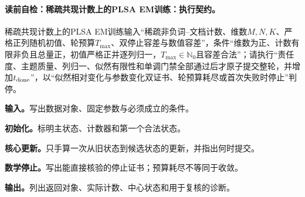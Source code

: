\paragraph{读前自检：稀疏共现计数上的PLSA EM训练：执行契约。}稀疏共现计数上的PLSA EM训练输入“稀疏非负词--文档计数、维数$M,N,K$、严格正列随机初值、轮预算$T_{\max}$、双停止容差与数值容差”，条件“维数为正、计数有限非负且总量正，初值严格正并逐列归一，$T_{\max}\in\mathbb N_0$且容差合法”；请执行“责任度、主题质量、列归一、似然有限性和单调门禁全部通过后才原子提交整轮，并增加$t_{\rm done}$”，以“似然相对变化与参数变化双证书、轮预算耗尽或首次失败时停止”判停。\par
\begin{keypointbox}[title={稀疏共现计数上的PLSA EM训练：五步阅读}]
\textbf{输入。}写出数据对象、固定参数与必须成立的条件。\par
\textbf{初始化。}标明主状态、计数器和第一个合法状态。\par
\textbf{核心更新。}只手算一次从旧状态到候选状态的更新，并指出何时提交。\par
\textbf{数学停止。}写出能直接核验的停止证书；预算耗尽不等同于收敛。\par
\textbf{输出。}列出返回对象、实际计数、中心状态和用于复核的诊断。
\end{keypointbox}

